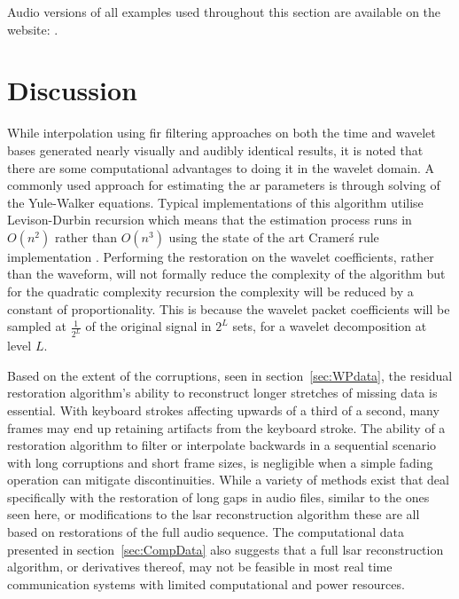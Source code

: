 Audio versions of all examples used throughout this section are available on the website: \siteURL.


\section{Discussion}\label{sec:RestorationDiscussion}

While interpolation using \gls{fir} filtering approaches on both the time and wavelet bases generated nearly visually and audibly identical results, it is noted that there are some computational advantages to doing it in the wavelet domain. A commonly used approach for estimating the \gls{ar} parameters is through solving of the Yule-Walker equations. Typical implementations of this algorithm utilise Levison-Durbin recursion which means that the estimation process runs in $O(n^2)$ \cite{Hayes1996} rather than $O(n^3)$ using the state of the art Cramer\'s rule implementation \cite{Habgood2012}. Performing the restoration on the wavelet coefficients, rather than the waveform, will not formally reduce the complexity of the algorithm but for the quadratic complexity recursion the complexity will be reduced by a constant of proportionality. This is because the wavelet packet coefficients will be sampled at $\frac{1}{2^L}$ of the original signal in $2^L$ sets, for a wavelet decomposition at level $L$.

Based on the extent of the corruptions, seen in section~\ref{sec:WPdata}, the residual restoration algorithm's ability to reconstruct longer stretches of missing data is essential. With keyboard strokes affecting upwards of a third of a second, many frames may end up retaining artifacts from the keyboard stroke. The ability of a restoration algorithm to filter or interpolate backwards in a sequential scenario with long corruptions and short frame sizes, is negligible when a simple fading operation can mitigate discontinuities. While a variety of methods exist that deal specifically with the restoration of long gaps in audio files, similar to the ones seen here, or modifications to the \gls{lsar} reconstruction algorithm \cite{Kauppinen2002a}\cite{Esquef2006} these are all based on restorations of the full audio sequence. The computational data presented in section~\ref{sec:CompData} also suggests that a full \gls{lsar} reconstruction algorithm, or derivatives thereof, may not be feasible in most real time communication systems with limited computational and power resources.

